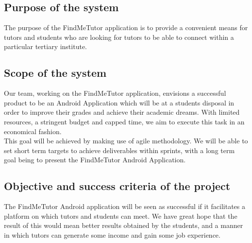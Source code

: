 \documentclass[12pt]{article}
\begin{document}
\subsection{Purpose of the system}
\begin{flushleft}
The purpose of the FindMeTutor application is to provide a convenient means for tutors and students who are looking for tutors to be able to connect within a particular tertiary institute.
\end{flushleft}
\subsection{Scope of the system}
\begin{flushleft}

Our team, working on the FindMeTutor application, envisions a successful product to be an Android Application which will be at a students disposal in order to improve their grades and achieve their academic dreams. With limited resources, a stringent budget and capped time, we aim to execute this task in an economical fashion.\\
This goal will be achieved by making use of agile methodology. We will be able to set short term targets to achieve deliverables within sprints, with a long term goal being to present the FindMeTutor Android Application.
\end{flushleft}
\subsection{Objective and success criteria of the project}
\begin{flushleft}
The FindMeTutor Android application will be seen as successful if it facilitates a platform on which tutors and students can meet. We have great hope that the result of this would mean better results obtained by the students, and a manner in which tutors can generate some income and gain some job experience.
\end{flushleft}
\end{document}
